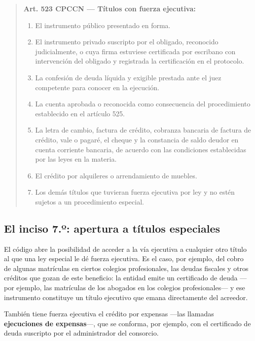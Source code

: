\documentclass[12pt,oneside]{book}
\begin{document}
\begin{quote}
\textbf{Art. 523 CPCCN --- Títulos con fuerza ejecutiva:}
\begin{enumerate}[label=\arabic*.º),leftmargin=2.2em]
    \item El instrumento público presentado en forma.
    \item El instrumento privado suscripto por el obligado, reconocido judicialmente, o cuya firma estuviese certificada por escribano con intervención del obligado y registrada la certificación en el protocolo.
    \item La confesión de deuda líquida y exigible prestada ante el juez competente para conocer en la ejecución.
    \item La cuenta aprobada o reconocida como consecuencia del procedimiento establecido en el artículo 525.
    \item La letra de cambio, factura de crédito, cobranza bancaria de factura de crédito, vale o pagaré, el cheque y la constancia de saldo deudor en cuenta corriente bancaria, de acuerdo con las condiciones establecidas por las leyes en la materia.
    \item El crédito por alquileres o arrendamiento de muebles.
    \item Los demás títulos que tuvieran fuerza ejecutiva por ley y no estén sujetos a un procedimiento especial.
\end{enumerate}
\end{quote}

\subsection{El inciso 7.º: apertura a títulos especiales}

El código abre la posibilidad de acceder a la vía ejecutiva a cualquier otro título al que una ley especial le dé fuerza ejecutiva. Es el caso, por ejemplo, del cobro de algunas matrículas en ciertos colegios profesionales, las deudas fiscales y otros créditos que gozan de este beneficio: la entidad emite un certificado de deuda ---por ejemplo, las matrículas de los abogados en los colegios profesionales--- y ese instrumento constituye un título ejecutivo que emana directamente del acreedor.

También tiene fuerza ejecutiva el crédito por expensas ---las llamadas \textbf{ejecuciones de expensas}---, que se conforma, por ejemplo, con el certificado de deuda suscripto por el administrador del consorcio.
\end{document}
